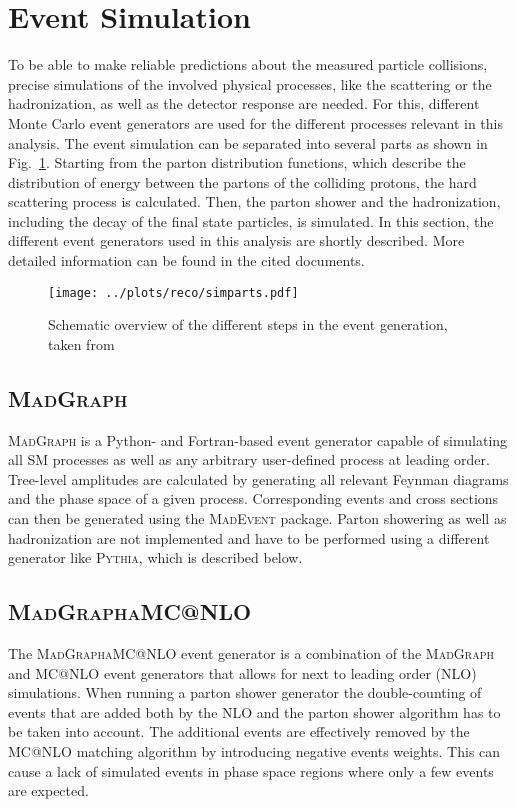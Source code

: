 \section{Event Simulation}
\label{sec:MC}
To be able to make reliable predictions about the measured particle collisions, precise simulations of the involved physical processes, like the scattering or the hadronization, as well as the detector response are needed. For this, different Monte Carlo event generators are used for the different processes relevant in this analysis. The event simulation can be separated into several parts as shown in Fig.~\ref{fig:reco:simparts}. Starting from the parton distribution functions, which describe the distribution of energy between the partons of the colliding protons, the hard scattering process is calculated. Then, the parton shower and the hadronization, including the decay of the final state particles, is simulated.  In this section, the different event generators used in this analysis are shortly described. More detailed information can be found in the cited documents. 
\begin{figure}
    \centering
    \texttt{[image: ../plots/reco/simparts.pdf]}
    \caption[Schemaric overview of the different steps in the event generation]{Schematic overview of the different steps in the event generation, taken from \cite{MCfig}}
    \label{fig:reco:simparts}
\end{figure}

\subsection*{\textsc{MadGraph}}
\textsc{MadGraph} \cite{madgraph} is a Python- and Fortran-based event generator capable of simulating all SM processes as well as any arbitrary user-defined process at leading order. Tree-level amplitudes are calculated by generating all relevant Feynman diagrams and the phase space of a given process. Corresponding events and cross sections can then be generated using the \textsc{MadEvent} package. Parton showering as well as hadronization are not implemented and have to be performed using a different generator like \textsc{Pythia}, which is described below.
\subsection*{\textsc{MadGraph\textunderscore aMC@NLO}}
The \textsc{MadGraph\textunderscore aMC@NLO} \cite{madgraph_aMC} event generator is a combination of the \textsc{MadGraph} and \textsc{MC@NLO} \cite{aMC} event generators that allows for next to leading order (NLO) simulations. When running a parton shower generator the double-counting of events that are added both by the NLO and the parton shower algorithm has to be taken into account. The additional events are effectively removed by the \textsc{MC@NLO} matching algorithm by introducing negative events weights. This can cause a lack of simulated events in phase space regions where only a few events are expected.
